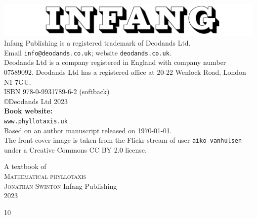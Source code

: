 { %



\thispagestyle{titlingpage}
{
\mbox{}\vspace{\fill}
		\centering	
		\includegraphics[width=.6\jfigwidth]{./Figures/infang.jpg}
		\\[10ex]
		Infang Publishing is a registered trademark of Deodands Ltd.
		\\
		Email \texttt{info@deodands.co.uk}; website \texttt{deodands.co.uk}.
	\\[5ex]
		Deodands Ltd is a company registered in England with company number 07589092. 
		Deodands Ltd has a registered office at
		20-22 Wenlock Road, London N1 7GU.
		\\[10ex] %
		{\textsc{ISBN}} 978-0-9931789-6-2 (softback)
		\\[10ex]
		\copyright Deodands Ltd 2023
		\\[20ex]
		\textbf{Book website:}
		\\
		\texttt{www.phyllotaxis.uk}
		\\[10ex]
		{Based on an author manuscript  \jdraftnumber{} released on \today.}
		\\[10ex]
The front cover image is taken from the Flickr stream of user \texttt{aiko vanhulsen} under a Creative Commons CC BY 2.0 license.\\
}
\newpage

\thispagestyle{titlingpage}
{
	\centering
	{\Huge A textbook of }
	\\[3ex]
	{\HUGE\jEmphasisColour	\textsc{Mathematical phyllotaxis}}\\
	\vfill
	{\Huge	\scshape Jonathan Swinton}
	\vfill
	{\Large	Infang Publishing}
	\\[3ex]
	{\Large \textsc{2023}
		\\}
}
\newpage

10}
